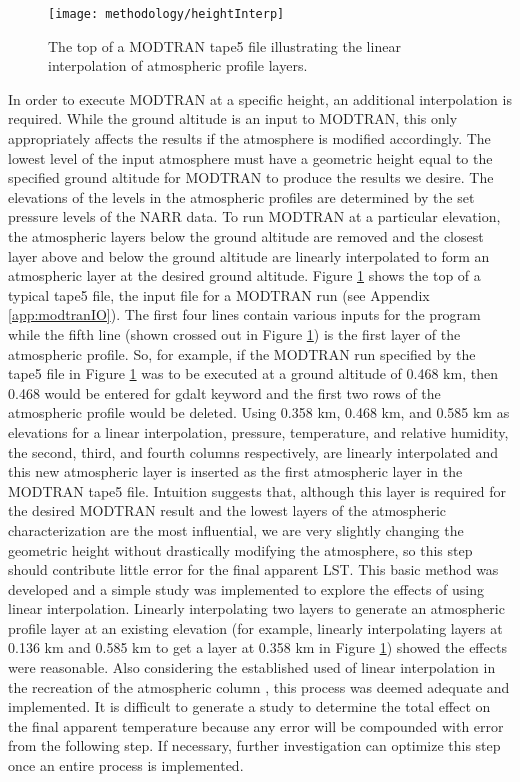 \documentclass{book}
\begin{document}
\begin{figure}[H]
\centering
\texttt{[image: methodology/heightInterp]}
\caption{The top of a MODTRAN tape5 file illustrating the linear interpolation of atmospheric profile layers.}
\label{fig:heightInterp}
\end{figure}

In order to execute MODTRAN at a specific height, an additional interpolation is required.  While the ground altitude is an input to MODTRAN, this only appropriately affects the results if the atmosphere is modified accordingly.  The lowest level of the input atmosphere must have a geometric height equal to the specified ground altitude for MODTRAN to produce the results we desire.  The elevations of the levels in the atmospheric profiles are determined by the set pressure levels of the NARR data.  To run MODTRAN at a particular elevation, the atmospheric layers below the ground altitude are removed and the closest layer above and below the ground altitude are linearly interpolated to form an atmospheric layer at the desired ground altitude.  Figure \ref{fig:heightInterp} shows the top of a typical tape5 file, the input file for a MODTRAN run (see Appendix \ref{app:modtranIO}).  The first four lines contain various inputs for the program while the fifth line (shown crossed out in Figure \ref{fig:heightInterp}) is the first layer of the atmospheric profile.  So, for example, if the MODTRAN run specified by the tape5 file in Figure \ref{fig:heightInterp} was to be executed at a ground altitude of 0.468 km, then 0.468 would be entered for gdalt keyword and the first two rows of the atmospheric profile would be deleted.  Using 0.358 km, 0.468 km, and 0.585 km as elevations for a linear interpolation, pressure, temperature, and relative humidity, the second, third, and fourth columns respectively, are linearly interpolated and this new atmospheric layer is inserted as the first atmospheric layer in the MODTRAN tape5 file.  Intuition suggests that, although this layer is required for the desired MODTRAN result and the lowest layers of the atmospheric characterization are the most influential, we are very slightly changing the geometric height without drastically modifying the atmosphere, so this step should contribute little error for the final apparent LST.  This basic method was developed and a simple study was implemented to explore the effects of using linear interpolation.  Linearly interpolating two layers to generate an atmospheric profile layer at an existing elevation (for example, linearly interpolating layers at 0.136 km and 0.585 km to get a layer at 0.358 km in Figure \ref{fig:heightInterp}) showed the effects were reasonable.  Also  considering the established used of linear interpolation in the recreation of the atmospheric column \cite{padula_2008}, this process was deemed adequate and implemented.  It is difficult to generate a study to determine the total effect on the final apparent temperature because any error will be compounded with error from the following step.  If necessary, further investigation can optimize this step once an entire process is implemented.
\end{document}
